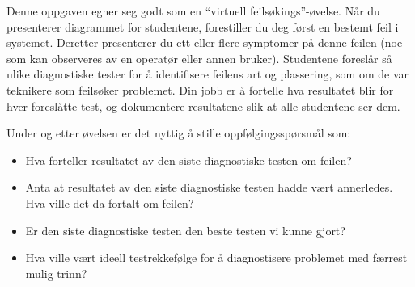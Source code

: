 Denne oppgaven egner seg godt som en ``virtuell feilsøkings''-øvelse. Når du presenterer diagrammet for studentene, forestiller du deg først en bestemt feil i systemet. Deretter presenterer du ett eller flere symptomer på denne feilen (noe som kan observeres av en operatør eller annen bruker). Studentene foreslår så ulike diagnostiske tester for å identifisere feilens art og plassering, som om de var teknikere som feilsøker problemet. Din jobb er å fortelle hva resultatet blir for hver foreslåtte test, og dokumentere resultatene slik at alle studentene ser dem.

Under og etter øvelsen er det nyttig å stille oppfølgingsspørsmål som:

\begin{itemize}
\item{} Hva forteller resultatet av den siste diagnostiske testen om feilen?
\item{} Anta at resultatet av den siste diagnostiske testen hadde vært annerledes. Hva ville det da fortalt om feilen?
\item{} Er den siste diagnostiske testen den beste testen vi kunne gjort?
\item{} Hva ville vært ideell testrekkefølge for å diagnostisere problemet med færrest mulig trinn?
\end{itemize}



